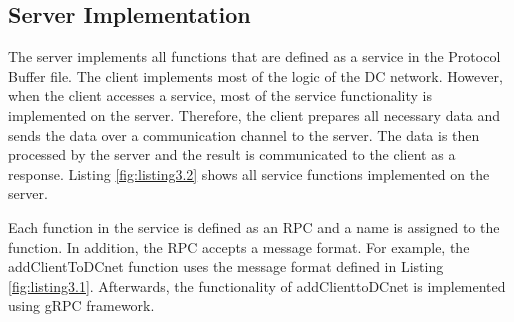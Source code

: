 \subsection{Server Implementation}
The server implements all functions that are defined as a service in the Protocol Buffer file. The client implements most of the logic of the DC network. However, when the client accesses a service, most of the service functionality is implemented on the server. Therefore, the client prepares all necessary data and sends the data over a communication channel to the server. The data is then processed by the server and the result is communicated to the client as a response. Listing \ref{fig:listing3.2} shows all service functions implemented on the server. %
\begin{nobreak} 
Each function in the service is defined as an \gls{RPC} and a name is assigned to the function. In addition, the \gls{RPC} accepts a message format. For example, the addClientToDCnet function uses the message format defined in Listing \ref{fig:listing3.1}. Afterwards, the functionality of addClienttoDCnet is implemented using gRPC framework.
\end{nobreak}
\\


\\ %

